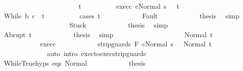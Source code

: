 \begin{isabellebody}
\ \ \ \ \ \ \isamarkupfalse%
\isanewline
\ \ \ \ \ \ \isacommand{{\isacharbraceleft}}\isamarkupfalse%
\isanewline
\ \ \ \ \ \ \ \ \isamarkupfalse%
\ t\isanewline
\ \ \ \ \ \ \ \ \isamarkupfalse%
\ exec{\isacharunderscore}c{\isacharcolon}\ {\isachardoublequoteopen}{\isasymGamma}{\isasymturnstile}{\isasymlangle}c{\isacharcomma}Normal\ s\ {\isasymrangle}\ {\isasymRightarrow}\ t{\isachardoublequoteclose}\isanewline
\ \ \ \ \ \ \ \ \isamarkupfalse%
\ {\isachardoublequoteopen}{\isasymGamma}{\isasymturnstile}While\ b\ c\ {\isasymdown}\ t{\isachardoublequoteclose}\isanewline
\ \ \ \ \ \ \ \ \isamarkupfalse%
\ {\isacharparenleft}cases\ t{\isacharparenright}\isanewline
\ \ \ \ \ \ \ \ \ \ \isamarkupfalse%
\ Fault\isanewline
\ \ \ \ \ \ \ \ \ \ \isamarkupfalse%
\ {\isacharquery}thesis\ \isamarkupfalse%
\ simp\isanewline
\ \ \ \ \ \ \ \ \isamarkupfalse%
\isanewline
\ \ \ \ \ \ \ \ \ \ \isamarkupfalse%
\ Stuck\isanewline
\ \ \ \ \ \ \ \ \ \ \isamarkupfalse%
\ {\isacharquery}thesis\ \isamarkupfalse%
\ simp\isanewline
\ \ \ \ \ \ \ \ \isamarkupfalse%
\isanewline
\ \ \ \ \ \ \ \ \ \ \isamarkupfalse%
\ {\isacharparenleft}Abrupt\ t{\isacharprime}{\isacharparenright}\isanewline
\ \ \ \ \ \ \ \ \ \ \isamarkupfalse%
\ {\isacharquery}thesis\ \isamarkupfalse%
\ simp\isanewline
\ \ \ \ \ \ \ \ \isamarkupfalse%
\isanewline
\ \ \ \ \ \ \ \ \ \ \isamarkupfalse%
\ {\isacharparenleft}Normal\ t{\isacharprime}{\isacharparenright}\isanewline
\ \ \ \ \ \ \ \ \ \ \isamarkupfalse%
\ exec{\isacharunderscore}c\isanewline
\ \ \ \ \ \ \ \ \ \ \isamarkupfalse%
\ {\isachardoublequoteopen}{\isasymGamma}{\isasymturnstile}{\isasymlangle}strip{\isacharunderscore}guards\ F\ c{\isacharcomma}Normal\ s\ {\isasymrangle}\ {\isasymRightarrow}\ Normal\ t{\isacharprime}{\isachardoublequoteclose}\isanewline
\ \ \ \ \ \ \ \ \ \ \ \ \isamarkupfalse%
\ {\isacharparenleft}auto\ intro{\isacharcolon}\ exec{\isacharunderscore}to{\isacharunderscore}exec{\isacharunderscore}strip{\isacharunderscore}guards{\isacharparenright}\isanewline
\ \ \ \ \ \ \ \ \ \ \isamarkupfalse%
\ WhileTrue{\isachardot}hyps\ eqs\ Normal\isanewline
\ \ \ \ \ \ \ \ \ \ \isamarkupfalse%
\ {\isacharquery}thesis\isanewline
\ \ \ \ \ \ \ \ \ \ \ \ \isamarkupfalse%

\end{isabellebody}
